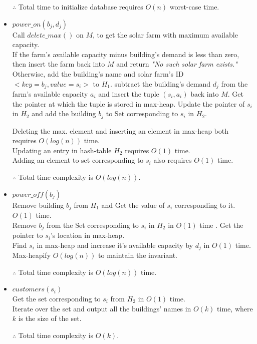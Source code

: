 \documentclass[12pt,twoside]{article}
\begin{document}
\begin{problems}
\begin{itemize}
    $\therefore$ Total time to initialize database requires $O(n)$ worst-case time.
    \item $power\_on(b_j, d_j)$ \\
    Call $delete\_max()$ on $M$, to get the solar farm with maximum available capacity. \\ 
    If the farm's available capacity minus building's demand is less than zero, then insert the farm back into $M$ and return \textit{"No such solar farm exists."} \\
    Otherwise, add the building's name and solar farm's ID $<key = b_j, value = s_i>$ to $H_1$. subtract the building's demand $d_j$ from the farm's available capacity $a_i$ and insert the tuple $(s_i, a_i)$ back into $M$. Get the pointer at which the tuple is stored in max-heap. Update the pointer of $s_i$ in $H_2$ and add the building $b_j$ to Set corresponding to $s_i$ in $H_2$.
    
    Deleting the max. element and inserting an element in max-heap both requires $O(log(n))$ time. \\
    Updating an entry in hash-table $H_2$ requires $O(1)$ time. \\
    Adding an element to set corresponding to $s_i$ also requires $O(1)$ time.
    
    $\therefore$ Total time complexity is $O(log(n))$.
    
    \item $power\_off(b_j)$ \\
    Remove building $b_j$ from $H_1$ and Get the value of $s_i$ corresponding to it. $O(1)$ time. \\
    Remove $b_j$ from the Set corresponding to $s_i$ in $H_2$ in $O(1)$ time . Get the pointer to $s_i$'s location in max-heap. \\
    Find $s_i$ in max-heap and increase it's available capacity by $d_j$ in $O(1)$ time. Max-heapify $O(log(n))$ to maintain the invariant.
    
    $\therefore$ Total time complexity is $O(log(n))$ time.
    \item $customers(s_i)$ \\
    Get the set corresponding to $s_i$ from $H_2$ in $O(1)$ time. \\
    Iterate over the set and output all the buildings' names in $O(k)$ time, where $k$ is the size of the set.
    
    $\therefore$ Total time complexity is $O(k)$.
\end{itemize}
\newpage
\problem  %


\end{problems}
\end{document}
